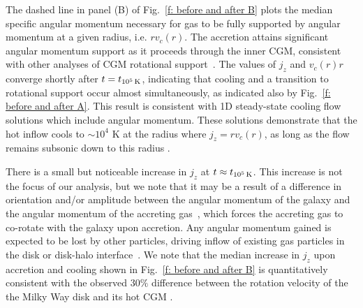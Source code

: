 \documentclass[fleqn,usenatbib]{mnras}
\newcommand{\tcools}{t_{10^5\,{\rm K}}}
\begin{document}
The dashed line in panel (B) of Fig.~\ref{f: before and after B} plots the median specific angular momentum necessary for gas to be fully supported by angular momentum at a given radius, i.e. $rv_c(r)$.
The accretion attains significant angular momentum support as it proceeds through the inner CGM, consistent with other analyses of CGM rotational support~\citep{Oppenheimer2018, Trapp2021}.
The values of $j_z$ and $v_c(r)r$ converge shortly after $t=\tcools$, indicating that cooling and a transition to rotational support occur almost simultaneously, as indicated also by Fig.~\ref{f: before and after A}.
This result is consistent with 1D steady-state cooling flow solutions which include angular momentum.
These solutions demonstrate that the hot inflow cools to $\sim10^4$ K at the radius where $j_z=r v_c(r)$, as long as the flow remains subsonic down to this radius \citep{Cowie1980, Stern2020}.

There is a small but noticeable increase in $j_z$ at $t \approx \tcools$.
This increase is not the focus of our analysis, but we note that it may be a result of a difference in orientation and/or amplitude between the angular momentum of the galaxy and the angular momentum of the accreting gas~\citep[e.g.][]{Danovich2012, DeFelippis2017}, which forces the accreting gas to co-rotate with the galaxy upon accretion.
Any angular momentum gained is expected to be lost by other particles, driving inflow of existing gas particles in the disk or disk-halo interface~\citep[e.g.][]{Mayor1981, Pezzulli2017}.
We note that the median increase in $j_z$ upon accretion and cooling shown in Fig.~\ref{f: before and after B} is quantitatively consistent with the observed $30\%$ difference between the rotation velocity of the the Milky Way disk and its hot CGM \citep{Hodges-Kluck2016}.

\end{document}
